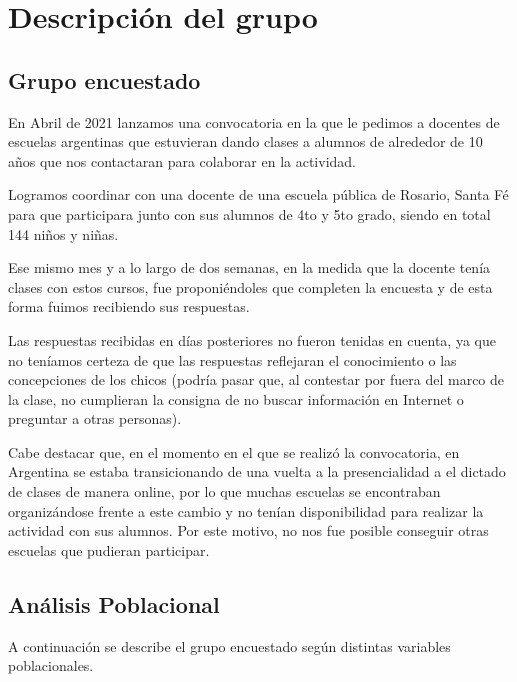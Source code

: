 \section{Descripción del grupo}

\subsection{Grupo encuestado}

En Abril de 2021 lanzamos una convocatoria en la que le pedimos a docentes de escuelas argentinas que estuvieran dando clases a alumnos de alrededor de 10 años que nos contactaran para colaborar en la actividad.

Logramos coordinar con una docente de una escuela pública de Rosario, Santa Fé para que participara junto con sus alumnos de 4to y 5to grado, siendo en total 144 niños y niñas.

Ese mismo mes y a lo largo de dos semanas, en la medida que la docente tenía clases con estos cursos, fue proponiéndoles que completen la encuesta y de esta forma fuimos recibiendo sus respuestas. 

Las respuestas recibidas en días posteriores no fueron tenidas en cuenta, ya que no teníamos certeza de que las respuestas reflejaran el conocimiento o las concepciones de los chicos (podría pasar que, al contestar por fuera del marco de la clase, no cumplieran la consigna de no buscar información en Internet o preguntar a otras personas).

Cabe destacar que, en el momento en el que se realizó la convocatoria, en Argentina se estaba transicionando de una vuelta a la presencialidad a el dictado de clases de manera online, por lo que muchas escuelas se encontraban organizándose frente a este cambio y no tenían disponibilidad para realizar la actividad con sus alumnos. Por este motivo, no nos fue posible conseguir otras escuelas que pudieran participar.

\subsection{Análisis Poblacional}

A continuación se describe el grupo encuestado según distintas variables poblacionales. 

